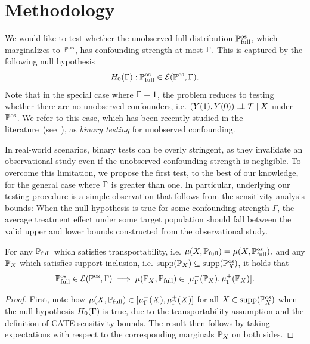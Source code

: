 \section{Methodology}\label{sec:test}

We would like to test whether the unobserved full distribution $\mathbb{P} ^{\operatorname{os}}_{\operatorname{full}}$, which marginalizes to $\mathbb{P}^{\operatorname{os}}$, has confounding strength at most $\Gamma$. This is captured by the following null hypothesis
$$H_0(\Gamma): \mathbb{P} ^{\operatorname{os}}_{\operatorname{full}} \in \mathcal{E}(\mathbb{P}^{\operatorname{os}},\Gamma).$$ 
Note that in the special case where $\Gamma=1$,  
the problem reduces to testing whether there are no unobserved confounders, i.e. $(Y(1),Y(0)) \perp \!\!\! \perp T \mid X$ under $\mathbb{P}^{\operatorname{os}}$. We refer to this case, which has been recently studied in the literature~(see~), as \emph{binary testing} for unobserved confounding. 


In real-world scenarios, binary tests can be overly stringent, as they invalidate an observational study even if the unobserved
confounding strength is negligible. To overcome this limitation, we propose the first test, to the best of our knowledge, for the general case where $\Gamma$ is greater than one. In particular, underlying our testing procedure is a simple observation that follows from the
sensitivity analysis bounds: When the null hypothesis is true for some confounding strength $\Gamma$, the average treatment effect under some target population should fall between the valid upper and lower bounds constructed from the observational study. \begin{lemma}
\label{lemma:test_1} For any $\mathbb{P}_{\operatorname{full}}$ which satisfies transportability, i.e. 
$
\mu(X,\mathbb{P}_{\operatorname{full}}) =\mu(X,\mathbb{P} ^{\operatorname{os}}_{\operatorname{full}}),
$
and any $\mathbb{P}_X$ which satisfies support inclusion, i.e. ${\operatorname{supp}}(\mathbb{P}_X) \subseteq {\operatorname{supp}}(\mathbb{P}^{\operatorname{os}}_X)$, it holds that
\begin{equation*}
\mathbb{P} ^{\operatorname{os}}_{\operatorname{full}} \in \mathcal{E}(\mathbb{P}^{\operatorname{os}},\Gamma) \implies \mu(\mathbb{P}_X, \mathbb{P}_{\operatorname{full}}) \in [\mu_\Gamma^-(\mathbb{P}_X), \mu_\Gamma^+(\mathbb{P}_X)].  
\end{equation*}
\end{lemma}\begin{proof}
First, note how $\mu(X, \mathbb{P}_{\operatorname{full}}) \in [\mu_\Gamma^-(X), \mu_\Gamma^+(X)]$ for all $X \in {\operatorname{supp}}(\mathbb{P}^{\operatorname{os}}_X)$ when the null hypothesis $H_0(\Gamma)$ is true, due to the transportability assumption and the definition of CATE sensitivity bounds. 
The result then follows by taking expectations with respect to the corresponding marginals $\mathbb{P}_X$ on both sides.
\end{proof}

